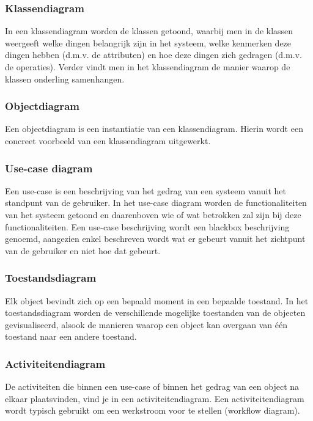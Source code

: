 \subsubsection{Klassendiagram}

In een klassendiagram worden de klassen getoond, waarbij men in de klassen weergeeft welke dingen belangrijk zijn in het systeem, welke kenmerken deze dingen hebben (d.m.v. de attributen) en hoe deze dingen zich gedragen (d.m.v. de operaties). Verder vindt men in het klassendiagram de manier waarop de klassen onderling samenhangen.

\subsubsection{Objectdiagram}

Een objectdiagram is een instantiatie van een klassendiagram. Hierin wordt een concreet voorbeeld van een klassendiagram uitgewerkt.

\subsubsection{Use-case diagram}

Een use-case is een beschrijving van het gedrag van een systeem vanuit het standpunt van de gebruiker. In het use-case diagram worden de functionaliteiten van het systeem getoond en daarenboven wie of wat betrokken zal zijn bij deze functionaliteiten. Een use-case beschrijving wordt een blackbox beschrijving genoemd, aangezien enkel beschreven wordt wat er gebeurt vanuit het zichtpunt van de gebruiker en niet hoe dat gebeurt.

\subsubsection{Toestandsdiagram}

Elk object bevindt zich op een bepaald moment in een bepaalde toestand. In het toestandsdiagram worden de verschillende mogelijke toestanden van de objecten gevisualiseerd, alsook de manieren waarop een object kan overgaan van één toestand naar een andere toestand.

\subsubsection{Activiteitendiagram}

De activiteiten die binnen een use-case of binnen het gedrag van een object na elkaar plaatsvinden, vind je in een activiteitendiagram. Een activiteitendiagram wordt typisch gebruikt om een werkstroom voor te stellen (workflow diagram).

